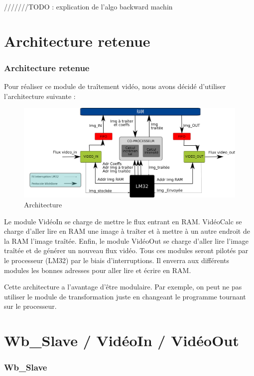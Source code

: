 \documentclass[a4paper,12pt]{report}
\begin{document}
{///////TODO : explication de l'algo backward machin}

	\part*{Architecture retenue}
	\section{Architecture retenue}
{Pour réaliser ce module de traîtement vidéo, nous avons décidé d'utiliser l'architecture suivante :
 
\begin{figure}[!h]
	\centering
	\includegraphics[scale = 0.1]{hardware-arch.png}
	\caption{Architecture}
\end{figure}

Le module VidéoIn se charge de mettre le flux entrant en RAM. VidéoCalc se charge d'aller lire en RAM une image à traîter et à mettre à un autre endroit de la RAM l'image traîtée. Enfin, le module VidéoOut se charge d'aller lire l'image traîtée et de générer un nouveau flux vidéo. Tous ces modules seront pilotés par le processeur (LM32) par le biais d'interruptions. Il enverra aux différents modules les bonnes adresses pour aller lire et écrire en RAM.


Cette architecture a l'avantage d'être modulaire. Par exemple, on peut ne pas utiliser le module de transformation juste en changeant le programme tournant sur le processeur.
}





    \part{Wb\_Slave / VidéoIn / VidéoOut}
    \section{Wb\_Slave}
\end{document}
